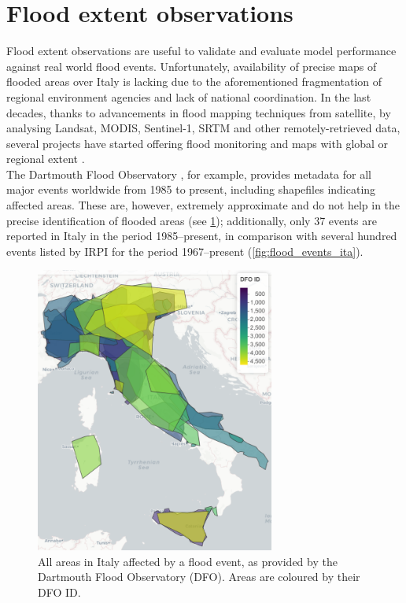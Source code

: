 \section{Flood extent observations} \label{sec:flood_obs}
Flood extent observations are useful to validate and evaluate model performance against real world flood events.
Unfortunately, availability of precise maps of flooded areas over Italy is lacking due to the aforementioned fragmentation of regional environment agencies and lack of national coordination.
In the last decades, thanks to advancements in flood mapping techniques from satellite, by analysing Landsat, MODIS, Sentinel-1, SRTM and other remotely-retrieved data, several projects have started offering flood monitoring and maps with global or regional extent \citep[see e.g.][]{Clement2017, Schlaffer2015, Martinis2015, SMITH1997, Martinis2013, Brakenridge2003, Westerhoff2013}.\\
The Dartmouth Flood Observatory \citep[DFO,][]{G.R.Brakenridge2015}, for example, provides metadata for all major events worldwide from 1985 to present, including shapefiles indicating affected areas.
These are, however, extremely approximate and do not help in the precise identification of flooded areas (see \cref{fig:DFO_floods_ita}); additionally, only 37 events are reported in Italy in the period 1985--present, in comparison with several hundred events listed by IRPI for the period 1967--present (\cref{fig:flood_events_ita}).
\begin{figure}
    \centering
    \includegraphics[width=0.7\textwidth]{figures/ita_flood/DFO_floods_ita}
    \decoRule
    \caption[Flooded areas in the DFO database]{
        All areas in Italy affected by a flood event, as provided by the Dartmouth Flood Observatory (DFO). Areas are coloured by their DFO ID.
} \label{fig:DFO_floods_ita}
\end{figure}

